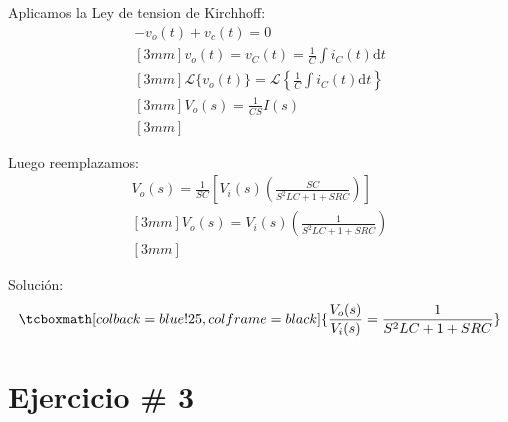 \documentclass[12pt]{article}
\begin{document}
Aplicamos la Ley de tension de Kirchhoff:
\begin{eqnarray*}
  -v_{o}(t) + v_{c}(t) = 0 \\ [3mm]
  v_{o}(t) = v_{C}(t) = \frac{1}{C}\int i_{C}(t) \mathrm{d}t \\ [3mm]
  \mathscr{L}\{v_{o}(t)\} = \mathscr{L}\left \{\frac{1}{C}\int i_{C}(t) \mathrm{d}t\right \} \\ [3mm]
  V_{o}(s) = \frac{1}{CS}I(s) \\ [3mm]
\end{eqnarray*}

Luego reemplazamos:
\begin{eqnarray*}
  V_{o}(s) = \frac{1}{SC}\left[ V_{i}(s)\left( \frac{SC}{S^{2}LC+1+SRC} \right) \right] \\ [3mm]
  V_{o}(s) = V_{i}(s)\left( \frac{1}{S^{2}LC+1+SRC} \right) \\ [3mm]
\end{eqnarray*}

Solución:
\begin{eqnarray*}
\tcboxmath[colback=blue!25,colframe=black] {\frac{V_{o}(s)}{V_{i}(s)} = \frac{1}{S^{2}LC+1+SRC}}
\end{eqnarray*}

\newpage

\section*{Ejercicio \# 3}
\end{document}
